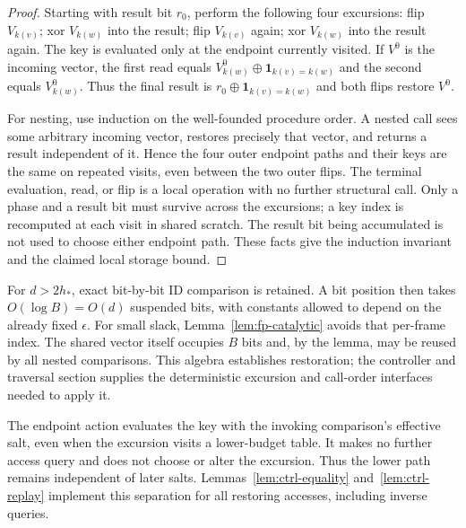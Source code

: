 \begin{proof}
Starting with result bit $r_0$, perform the following four excursions:
flip $V_{k(v)}$; xor $V_{k(w)}$ into the result; flip $V_{k(v)}$ again;
xor $V_{k(w)}$ into the result again.  The key is evaluated only at the
endpoint currently visited.  If $V^0$ is the incoming vector, the first
read equals $V^0_{k(w)}\mathbin\oplus\mathbf1_{k(v)=k(w)}$ and the
second equals $V^0_{k(w)}$.  Thus the final result is
$r_0\mathbin\oplus\mathbf1_{k(v)=k(w)}$ and both flips restore $V^0$.

For nesting, use induction on the well-founded procedure order.  A
nested call sees some arbitrary incoming vector, restores precisely
that vector, and returns a result independent of it.  Hence the four
outer endpoint paths and their keys are the same on repeated visits,
even between the two outer flips.  The terminal evaluation, read, or
flip is a local operation with no further structural call.  Only a
phase and a result bit must survive across the excursions; a key index
is recomputed at each visit in shared scratch.  The result bit being
accumulated is not used to choose either endpoint path.  These facts
give the induction invariant and the claimed local storage bound.
\end{proof}

For $d>2h_*$, exact bit-by-bit ID comparison is retained.  A bit position
then takes $O(\log B)=O(d)$ suspended bits, with constants allowed to
depend on the already fixed $\epsilon$.  For small slack,
Lemma~\ref{lem:fp-catalytic} avoids that per-frame index.  The shared
vector itself occupies $B$ bits and, by the lemma, may be reused by all
nested comparisons.  This algebra establishes restoration; the
controller and traversal section supplies the deterministic excursion
and call-order interfaces needed to apply it.

The endpoint action evaluates the key with the invoking comparison's
effective salt, even when the excursion visits a lower-budget table.
It makes no further access query and does not choose or alter the
excursion.  Thus the lower path remains independent of later salts.
Lemmas~\ref{lem:ctrl-equality} and~\ref{lem:ctrl-replay} implement this
separation for all restoring accesses, including inverse queries.
